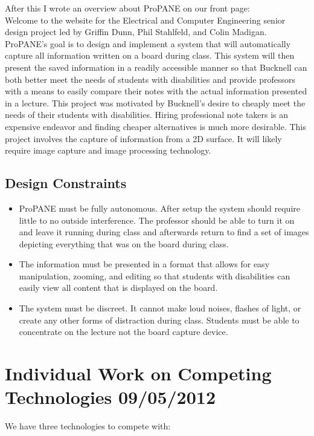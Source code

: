 \documentclass[]{article}
\begin{document}
					After this I wrote an overview about ProPANE on our front page:\\
			Welcome to the website for the Electrical and Computer Engineering senior design project led by Griffin Dunn, Phil Stahlfeld, and Colin Madigan.
			ProPANE's goal is to design and implement a system that will automatically capture all information written on a board during class. This system will then present the saved information in a readily accessible manner so that Bucknell can both better meet the needs of students with disabilities and provide professors with a means to easily compare their notes with the actual information presented in a lecture.
			This project was motivated by Bucknell’s desire to cheaply meet the needs of their students with disabilities. Hiring professional note takers is an expensive endeavor and finding cheaper alternatives is much more desirable.
			This project involves the capture of information from a 2D surface. It will likely require image capture and image processing technology.
		\subsection{Design Constraints}
			\begin{itemize}			
				\item ProPANE must be fully autonomous. After setup the system should require little to no outside interference. The professor should be able to turn it on and leave it running during class and afterwards return to find a set of images depicting everything that was on the board during class.
				\item The information must be presented in a format that allows for easy manipulation, zooming, and editing so that students with disabilities can easily view all content that is displayed on the board.
				\item The system must be discreet. It cannot make loud noises, flashes of light, or create any other forms of distraction during class. Students must be able to concentrate on the lecture not the board capture device.
			\end{itemize}

	
	
	\section{Individual Work on Competing Technologies 09/05/2012}
		We have three technologies to compete with: 
		
\end{document}
